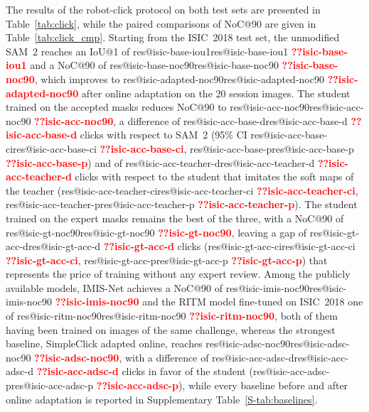 \documentclass[runningheads]{llncs}
\makeatletter
\newcommand{\res}[1]{\ifcsname res@#1\endcsname\csname res@#1\endcsname
  \else\textbf{\textcolor{red}{??#1}}\fi}
\makeatother
\begin{document}
The results of the robot-click protocol on both test sets are presented in Table~\ref{tab:click}, while the paired comparisons of NoC@90 are given in Table~\ref{tab:click_cmp}. Starting from the ISIC~2018 test set, the unmodified SAM~2 reaches an IoU@1 of \res{isic-base-iou1} and a NoC@90 of \res{isic-base-noc90}, which improves to \res{isic-adapted-noc90} after online adaptation on the 20 session images. The student trained on the accepted masks reduces NoC@90 to \res{isic-acc-noc90}, a difference of \res{isic-acc-base-d} clicks with respect to SAM~2 (95\% CI \res{isic-acc-base-ci}, \res{isic-acc-base-p}) and of \res{isic-acc-teacher-d} clicks with respect to the student that imitates the soft maps of the teacher (\res{isic-acc-teacher-ci}, \res{isic-acc-teacher-p}). The student trained on the expert masks remains the best of the three, with a NoC@90 of \res{isic-gt-noc90}, leaving a gap of \res{isic-gt-acc-d} clicks (\res{isic-gt-acc-ci}, \res{isic-gt-acc-p}) that represents the price of training without any expert review. Among the publicly available models, IMIS-Net achieves a NoC@90 of \res{isic-imis-noc90} and the RITM model fine-tuned on ISIC~2018 one of \res{isic-ritm-noc90}, both of them having been trained on images of the same challenge, whereas the strongest baseline, SimpleClick adapted online, reaches \res{isic-adsc-noc90}, with a difference of \res{isic-acc-adsc-d} clicks in favor of the student (\res{isic-acc-adsc-p}), while every baseline before and after online adaptation is reported in Supplementary Table~\ref{S-tab:baselines}.
\end{document}
